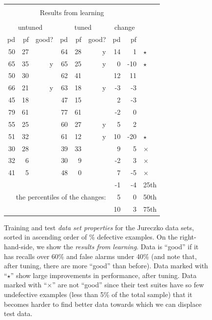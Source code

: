 \documentclass[conference]{IEEEtran}
\begin{document}
\begin{figure}[!t]
\begin{center}
\begin{minipage}{.46\linewidth}
\begin{tabular}{r@{~}|l@{~}|r@{~}|l@{~}|r@{~}|r@{~}|}
        
    \end{tabular}\end{minipage}\begin{minipage}{.4\linewidth}
    \begin{tabular}{|rrr|rrr|rr|l} \cline{1-8}
      \multicolumn{8}{|c|}{  }\\
      \multicolumn{8}{|c|}{  Results from learning}\\
       \multicolumn{8}{|c|}{   }\\
   \multicolumn{3}{|c|}{untuned} & \multicolumn{3}{c|}{tuned} & \multicolumn{2}{c|}{change}\\
  \cline{1-8}
  
  pd & pf & good? & pd & pf & good? & pd & pf\\\cline{1-8}
  50 & 27 &   & 64 & 28 & y & 14 & 1&$\star$\\
  65 & 35 & y & 65 & 25 & y & 0 & -10&$\star$\\
  50 & 30 &   & 62 & 41 &   & 12 & 11\\
  66 & 21 & y & 63 & 18 & y & -3 & -3\\
  45 & 18 &   & 47 & 15 &   & 2 & -3\\
  79 & 61 &   & 77 & 61 &   & -2 & 0\\
  55 & 25 &   & 60 & 27 & y & 5 & 2\\
  51 & 32 &   & 61 & 12 & y & 10 & -20&$\star$\\
 30 & 28 &   & 39 & 33 &   & 9 & 5&$\times$\\
  32 & 6 &   & 30 & 9 &   & -2 & 3&$\times$\\
  41 & 5 &   & 48 & 0 &   & 7 & -5&$\times$\\
\hline
  \multicolumn{5}{c}{~}    &  & -1 & -4& 25th\\
\multicolumn{6}{r|}{the percentiles of the changes:}    &   5 & 0 & 50th\\
 \multicolumn{5}{c}{~}             & & 10 & 3 & 75th\\
\end{tabular}

\end{minipage}
\end{center}    
  
    \caption{Training and test {\em data set properties} for the Jureczko data sets,
    sorted in ascending order of \% defective examples.
    On the right-hand-side, we show the {\em results from learning}.
    Data is ``good'' if it has   recalls over 60\% and false alarms under 40\%
(and note that, after tuning, there are more ``good'' than before).
Data   marked with ``$\star$'' show large improvements in performance, after tuning.
Data   marked with ``$\times$'' are not ``good'' since their test suites  have so few undefective examples (less than 5\% of the total sample) that it becomes harder to find better data towards which we can displace test data.
}\label{fig:j}
\end{figure}
\end{document}
